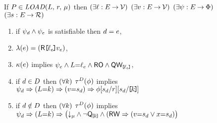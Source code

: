 \begin{figure*}
\begin{center}
\begin{minipage}{0.88\textwidth}

  \noindent
  If $\aPS \in \sLOAD[\amode]{\cExp}{\aReg}$ then
  $(\exists\cVal:\aEvs\fun\Val)$
  $(\exists\aVal:\aEvs\fun\Val)$
  $(\exists\bForm:\aEvs\fun\Formulae)$
  $(\exists\bReg:\aEvs\fun\Reg)$
  \begin{enumerate}
  \item if $\bForm_\bEv\land\bForm_\aEv$ is satisfiable then $\bEv=\aEv$,
  \item $\labelingAct(\aEv) = \DRREFP{\cVal_\aEv}{\aVal_\aEv}$,
  \item $\labelingForm(\aEv)$ implies
    \begin{math}
      \bForm_\aEv
      \land \cExp{=}\cVal_\aEv
      \land \RO
      \land \QwREF{\cVal_\aEv}
    \end{math},
  \item if $\bEv\in\bEvs$ then
    \begin{math}
      (\forall\dVal)
    \end{math}
    $\aTr[\bEvs](\aForm)$ implies
    \begin{math}
      \bForm_\bEv
      \limplies (\cExp{=}\dVal)
      \limplies (\aVal{=}\bReg_\bEv)
      \limplies \aForm[\bReg_\bEv/\aReg][\bReg_\bEv/\REF{\dVal}]
    \end{math}
    \makebox[4.4cm]{}
  \item if $\bEv\notin\bEvs$ then
    \begin{math}
      (\forall\dVal)
    \end{math}
    $\aTr[\bEvs](\aForm)$ implies
    \begin{math}
      \bForm_\bEv
      \limplies (\cExp{=}\dVal)
      \limplies \PBRbig{        
        \Dmode{\amode}
        \land \lnot\QxREF{\dVal}
        \land
        (\RW
         \limplies (\aVal{=}\bReg_\bEv\lor\aLoc{=}\bReg_\bEv) 
}
\end{math}
\end{enumerate}
\end{minipage}
\end{center}
\end{figure*}
